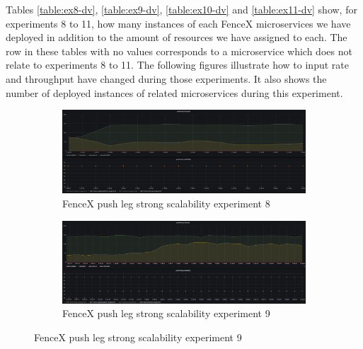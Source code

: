 \documentclass[a4]{report}
\begin{document}
    Tables \ref{table:ex8-dv}, \ref{table:ex9-dv}, \ref{table:ex10-dv} and \ref{table:ex11-dv} show, for experiments
    8 to 11, how many instances of each FenceX microservices we have deployed in addition to the amount of resources
    we have assigned to each.
    The row in these tables with no values corresponds to a microservice which does not relate to experiments 8 to 11.
    The following figures illustrate how to input rate and throughput have changed during those experiments.
    It also shows the number of deployed instances of related microservices during this experiment.

    \begin{figure}
        \centering
        \begin{subfigure}[b]{\textwidth}
            \centering
            \caption{FenceX push leg strong scalability experiment 8}
            \label{fig:ex8}
            \includegraphics[width=\textwidth, height=0.35\textheight, scale=2]{images/evaluation/ex8-benchmarking-ongoing-2per4sec.png}
        \end{subfigure}

        \begin{subfigure}[b]{\textwidth}
            \centering
            \caption{FenceX push leg strong scalability experiment 9}
            \label{fig:ex9}
            \includegraphics[width=\textwidth, height=0.35\textheight, scale=2]{images/evaluation/ex9-benchmarking-ongoing-2per4sec.png}
        \end{subfigure}
    \end{figure}
\end{document}
